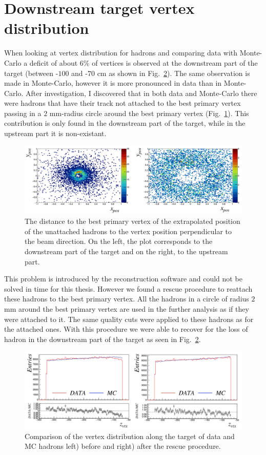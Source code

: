 \section{Downstream target vertex distribution}

When looking at vertex distribution for hadrons and comparing data with Monte-Carlo a deficit of about $6$\% of vertices is observed at the downstream part of the target (between -$100$ and -$70$ cm as shown in Fig.~\ref{VertexDrop}). The same observation is made in Monte-Carlo, however it is more pronounced in data than in Monte-Carlo. After investigation, I discovered that in both data and Monte-Carlo there were hadrons that have their track not attached to the best primary vertex passing in a $2$ mm-radius circle around the best primary vertex (Fig.~\ref{CircleHadron}). This contribution is only found in the downstream part of the target, while in the upstream part it is non-existant.

\begin{figure}[!h]
	\includegraphics[scale=0.45]{./gfx/CircleHadron.png}
	\caption{The distance to the best primary vertex of the extrapolated position of the unattached hadrons to the vertex position perpendicular to the beam direction. On the left, the plot corresponds to the downstream part of the target and on the right, to the upstream part.}
	\label{CircleHadron}
\end{figure}

This problem is introduced by the reconstruction software and could not be solved in time for this thesis. However we found a rescue procedure to reattach these hadrons to the best primary vertex. All the hadrons in a circle of radius $2$ mm around the best primary vertex are used in the further analysis as if they were attached to it. The same quality cuts were applied to these hadrons as for the attached ones. With this procedure we were able to recover for the loss of hadron in the downstream part of the target as seen in Fig.~\ref{VertexDrop}.

\begin{figure}[!h]
	\includegraphics[scale=0.45]{./gfx/VertexDrop.png}
	\caption{Comparison of the vertex distribution along the target of data and MC hadrons left) before and right) after the rescue procedure.}
	\label{VertexDrop}
\end{figure}

